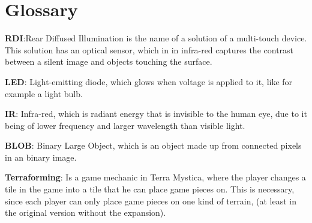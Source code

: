 \chapter*{Glossary}\label{gloss}

\textbf{RDI}:Rear Diffused Illumination is the name of a solution of a multi-touch device\citep{multiTT}. This solution has an optical sensor, which in in infra-red captures the contrast between a silent image and objects touching the surface.

\textbf{LED}: Light-emitting diode, which glows when voltage is applied to it, like for example a light bulb.

\textbf{IR}: Infra-red, which is radiant energy that is invisible to the human eye, due to it being of lower frequency and larger wavelength than visible light.

\textbf{BLOB}: Binary Large Object, which is an object made up from connected pixels in an binary image. 

\textbf{Terraforming}: Is a game mechanic in Terra Mystica, where the player changes a tile in the game into a tile that he can place game pieces on. This is necessary, since each player can only place game pieces on one kind of terrain, (at least in the original version without the expansion).
